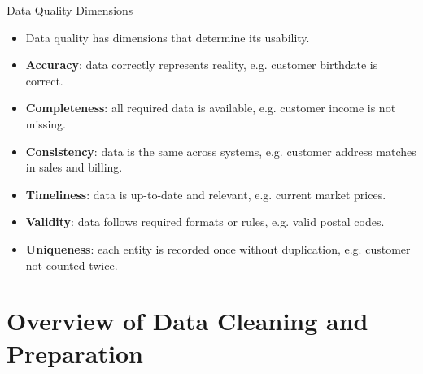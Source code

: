 \documentclass[aspectratio=169, table]{beamer}
\begin{document}
\begin{frame}{Data Quality Dimensions}
	\vspace{20pt}
	
	\begin{itemize}
		\item Data quality has dimensions that determine its usability.
		
		\item \textbf{Accuracy}: data correctly represents reality, e.g. customer birthdate is correct.
		
		\item \textbf{Completeness}: all required data is available, e.g. customer income is not missing.
		
		\item \textbf{Consistency}: data is the same across systems, e.g. customer address matches in sales and billing.
		
		\item \textbf{Timeliness}: data is up-to-date and relevant, e.g. current market prices.
		
		\item \textbf{Validity}: data follows required formats or rules, e.g. valid postal codes.
		
		\item \textbf{Uniqueness}: each entity is recorded once without duplication, e.g. customer not counted twice.
	\end{itemize}
	
\end{frame}

\section{Overview of Data Cleaning and Preparation}
\end{document}
